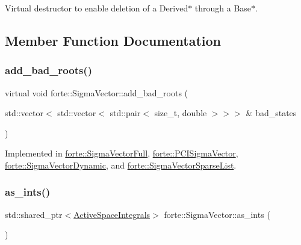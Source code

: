 Virtual destructor to enable deletion of a Derived$\ast$ through a Base$\ast$. 



\subsection{Member Function Documentation}
\mbox{\label{classforte_1_1_sigma_vector_a5cd950852f515bc082ca1df31bd84e3e}} 
\subsubsection{\texorpdfstring{add\+\_\+bad\+\_\+roots()}{add\_bad\_roots()}}
{\footnotesize\ttfamily virtual void forte\+::\+Sigma\+Vector\+::add\+\_\+bad\+\_\+roots (\begin{DoxyParamCaption}\item[{std\+::vector$<$ std\+::vector$<$ std\+::pair$<$ size\+\_\+t, double $>$$>$$>$ \&}]{bad\+\_\+states }\end{DoxyParamCaption})\hspace{0.3cm}{\ttfamily [pure virtual]}}



Implemented in \mbox{\hyperlink{classforte_1_1_sigma_vector_full_a231cdb205bf558b4270daae212bd9dc6}{forte\+::\+Sigma\+Vector\+Full}}, \mbox{\hyperlink{classforte_1_1_p_c_i_sigma_vector_a4ed2811d6e69abd2b542c7749174c9d3}{forte\+::\+P\+C\+I\+Sigma\+Vector}}, \mbox{\hyperlink{classforte_1_1_sigma_vector_dynamic_a06fa37f7134ca1b1efbfc77ccb8afa01}{forte\+::\+Sigma\+Vector\+Dynamic}}, and \mbox{\hyperlink{classforte_1_1_sigma_vector_sparse_list_a1fa83f96983a54077f5982befce39858}{forte\+::\+Sigma\+Vector\+Sparse\+List}}.

\mbox{\label{classforte_1_1_sigma_vector_aa732888f759ba00fa059ad1020425fe9}} 
\subsubsection{\texorpdfstring{as\+\_\+ints()}{as\_ints()}}
{\footnotesize\ttfamily std\+::shared\+\_\+ptr$<$\mbox{\hyperlink{classforte_1_1_active_space_integrals}{Active\+Space\+Integrals}}$>$ forte\+::\+Sigma\+Vector\+::as\+\_\+ints (\begin{DoxyParamCaption}{ }\end{DoxyParamCaption})\hspace{0.3cm}{\ttfamily [inline]}}

